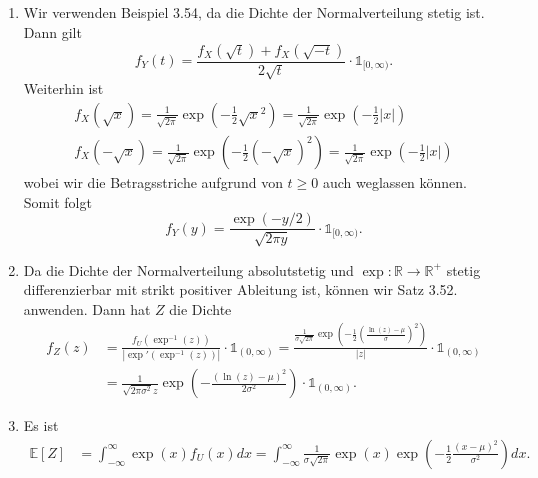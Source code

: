 \documentclass{article}
\def\to{\ensuremath{\rightarrow}} %
\def\R{\ensuremath{\mathbb{R}}}
\begin{document}
\subsection{}

\begin{enumerate}[label=(\alph*)]
	\item Wir verwenden Beispiel 3.54, da die Dichte der Normalverteilung stetig ist. Dann gilt
	      \begin{equation*}
		      f_{Y}(t) = \frac{f_X(\sqrt{t}) + f_X(\sqrt{-t})}{2 \sqrt{t}} \cdot \mathds{1}_{[0, \infty)}\text{.}
	      \end{equation*}
	      Weiterhin ist
	      \begin{align*}
		      f_X(\sqrt{x}) = \frac{1}{\sqrt{2 \pi}} \exp\left(- \frac{1}{2}\sqrt{x}^2\right) = \frac{1}{\sqrt{2 \pi}} \exp\left(- \frac{1}{2} |x|\right) \\
		      f_X(-\sqrt{x}) = \frac{1}{\sqrt{2 \pi}} \exp\left(- \frac{1}{2}(-\sqrt{x})^2\right) = \frac{1}{\sqrt{2 \pi}} \exp\left(- \frac{1}{2} |x|\right)
	      \end{align*}
	      wobei wir die Betragsstriche aufgrund von $t \geq 0$ auch weglassen können. Somit folgt
	      \begin{equation*}
		      f_{Y}(y) = \frac{\exp\left(- y / 2\right)}{\sqrt{2 \pi y}} \cdot \mathds{1}_{[0, \infty)}\text{.}
	      \end{equation*}
	\item Da die Dichte der Normalverteilung absolutstetig und $\exp: \R \to \R^+$ stetig differenzierbar mit strikt positiver Ableitung ist, können wir Satz 3.52. anwenden. Dann hat $Z$ die Dichte
	      \begin{align*}
		      f_Z(z) & = \frac{f_U(\exp^{-1}(z))}{|\exp'(\exp^{-1}(z))|} \cdot \mathds{1}_{(0, \infty)} = \frac{\frac{1}{\sigma \sqrt{2 \pi}} \exp\left(-\frac{1}{2} \left(\frac{\ln(z) - \mu}{\sigma}\right)^2\right)}{|z|} \cdot \mathds{1}_{(0, \infty)} \\
		             & = \frac{1}{ \sqrt{2 \pi \sigma^2} z} \exp\left( -\frac{(\ln(z) - \mu)^2}{2\sigma^2}\right)\cdot \mathds{1}_{(0, \infty)}\text{.}
	      \end{align*}
	\item Es ist
	      \begin{align*}
		      \mathds{E}[Z] & = \int_{-\infty}^{\infty} \exp(x) f_U(x) dx = \int_{-\infty}^{\infty} \frac{1}{\sigma \sqrt{2 \pi}} \exp(x) \exp\left(- \frac{1}{2} \frac{(x - \mu)^2}{\sigma^2}\right) dx\text{.}
	      \end{align*}

\end{enumerate}
\end{document}
